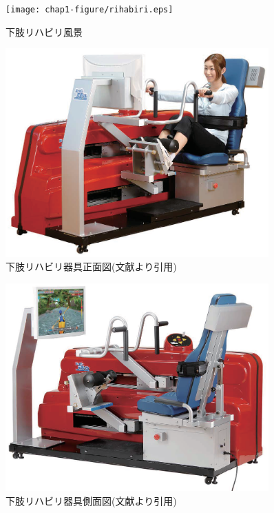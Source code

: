 \begin{figure}[tbp]
	\centering
			\texttt{[image: chap1-figure/rihabiri.eps]}
	\caption{下肢リハビリ風景}
	\label{fig:rihabiri}
\end{figure}

\begin{figure}[tbp]
	\centering
			\includegraphics[width=0.9\textwidth]{chap1-figure/s-1.eps}
	\caption{下肢リハビリ器具正面図(文献\cite{フィットネスマシン}より引用)}
	\label{fig:smart-1}
\end{figure}

\begin{figure}[tbp]
	\centering
			\includegraphics[width=0.9\textwidth]{chap1-figure/s-2.eps}
	\caption{下肢リハビリ器具側面図(文献\cite{フィットネスマシン}より引用)}
	\label{fig:smart-2}
\end{figure}

